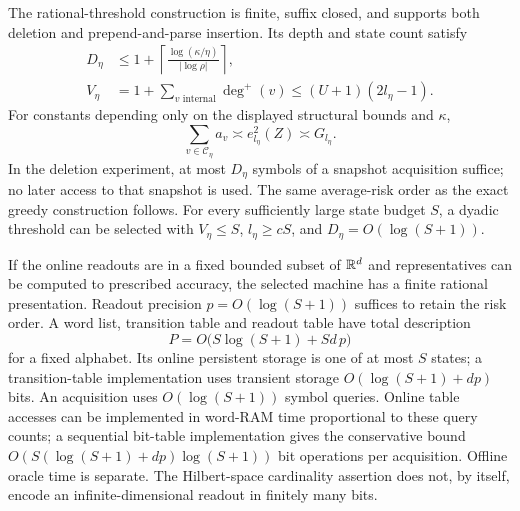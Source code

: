 \begin{theorem}
\label{thm:v8-certified}
The rational-threshold construction is finite, suffix closed, and
supports both deletion and prepend-and-parse insertion. Its depth and
state count satisfy
\begin{align}
 D_\eta&\le1+\left\lceil
                    \frac{\log(\kappa/\eta)}{|\log\rho|}\right\rceil,
                                                        \label{eq:v8-depth}\\
 V_\eta&=1+\sum_{v\text{ internal}}\deg^+(v)
                      \le (U+1)(2l_\eta-1).             \label{eq:v8-vertices}
\end{align}
For constants depending only on the displayed structural bounds and
$\kappa$,
\begin{equation}
 \sum_{v\in\mathcal C_\eta}a_v
                 \asymp e_{l_\eta}^2(Z)\asymp G_{l_\eta}.
                                                        \label{eq:v8-threshold-optimal}
\end{equation}
In the deletion experiment, at most $D_\eta$ symbols of a snapshot
acquisition suffice; no later access to that snapshot is used. The
same average-risk order as the exact greedy construction follows.
For every sufficiently large state budget $S$, a dyadic threshold can
be selected with $V_\eta\le S$, $l_\eta\ge cS$, and
$D_\eta=O(\log(S+1))$.

If the online readouts are in a fixed bounded subset of $\mathbb R^d$ and
representatives can be computed to prescribed accuracy, the selected
machine has a finite rational presentation. Readout precision
$p=O(\log(S+1))$ suffices to retain the risk order. A word list, transition
table and readout table have total description
\begin{equation}
 P=O\bigl(S\log(S+1)+Sd\,p\bigr)                     \label{eq:v8-description}
\end{equation}
for a fixed alphabet. Its online persistent storage is one of at most
$S$ states; a transition-table implementation uses transient storage
$O(\log(S+1)+dp)$ bits. An acquisition uses $O(\log(S+1))$ symbol queries.
Online table accesses can be implemented in word-RAM time proportional
to these query counts; a sequential bit-table implementation gives the
conservative bound $O(S(\log(S+1)+dp)\log(S+1))$ bit operations per
acquisition. Offline oracle time is separate. The Hilbert-space
cardinality assertion does not, by itself, encode an infinite-dimensional
readout in finitely many bits.
\end{theorem}

